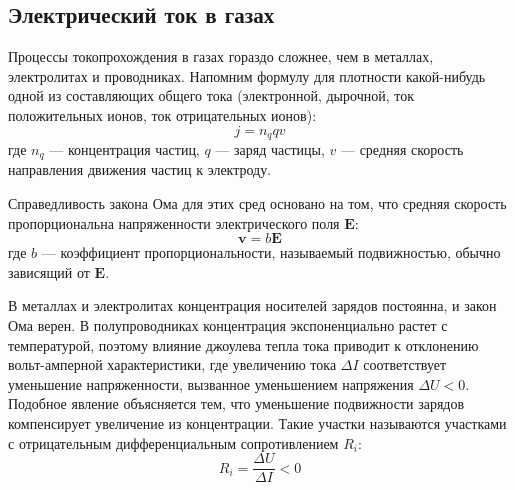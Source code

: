 \documentclass[a4paper, 12pt]{article}
\begin{document}
	\subsection{Электрический ток в газах}
Процессы токопрохождения в газах гораздо сложнее, чем в металлах, электролитах и проводниках. Напомним формулу для плотности какой-нибудь одной из составляющих общего тока (электронной, дырочной, ток положительных ионов, ток отрицательных ионов):
\begin{equation}
j=n_qqv
\end{equation}
где $n_q$ — концентрация частиц, $q$ — заряд частицы, $v$ — средняя скорость направления движения частиц к электроду.\par
Справедливость закона Ома для этих сред основано на том, что средняя скорость пропорциональна напряженности электрического поля $\mathbf{E}$:
\begin{equation}
\mathbf{v}=b\mathbf{E}
\end{equation}
где $b$ — коэффициент пропорциональности, называемый подвижностью, обычно зависящий от $\mathbf{E}$.\par
В металлах и электролитах концентрация носителей зарядов постоянна, и закон Ома верен. В полупроводниках концентрация экспоненциально растет с температурой, поэтому влияние джоулева тепла тока приводит к отклонению вольт-амперной характеристики, где увеличению тока $\Delta I$ соответствует уменьшение напряженности, вызванное уменьшением напряжения $\Delta U<0$. Подобное явление объясняется тем, что уменьшение подвижности зарядов компенсирует увеличение из концентрации. Такие участки называются участками с отрицательным дифференциальным сопротивлением $R_i$:
\begin{equation}
R_i=\frac{\Delta U}{\Delta I}<0
\end{equation}
\par
\end{document}
